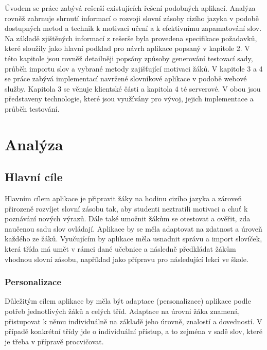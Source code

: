 \documentclass[a4paper,11pt,titlepage,fleqn]{article}
\begin{document}
    Úvodem se práce zabývá rešerší existujících řešení podobných aplikací. Analýza rovněž zahrnuje shrnutí informací o rozvoji slovní zásoby cizího jazyka v podobě dostupných metod a technik k motivaci učení a k efektivnímu zapamatování slov. Na základě zjištěných informací z rešerše byla provedena specifikace požadavků, které sloužily jako hlavní podklad pro návrh aplikace popsaný v kapitole 2. V této kapitole jsou rovněž detailněji popsány způsoby generování testovací sady, průběh importu slov a vybrané metody zajišťující motivaci žáků. V kapitole 3 a 4 se práce zabývá implementací navržené slovníkové aplikace v podobě webové služby. Kapitola 3 se věnuje klientské části a kapitola 4 té serverové. V obou jsou představeny technologie, které jsou využívány pro vývoj, jejich implementace a průběh testování. 



\newpage
\section{Analýza}
    
    \subsection{Hlavní cíle}
        
        Hlavním cílem aplikace je připravit žáky na hodinu cizího jazyka a zároveň přirozeně rozvíjet slovní zásobu tak, aby studenti neztratili motivaci a chuť k poznávání nových výrazů. Dále také umožnit žákům se otestovat a ověřit, zda naučenou sadu slov ovládají. Aplikace by se měla adaptovat na zdatnost a úroveň každého ze žáků. Vyučujícím by aplikace měla usnadnit správu a import slovíček, která třída má umět v rámci dané učebnice a následně předkládat žákům vhodnou slovní zásobu, například jako přípravu pro následující lekci ve škole.

        \subsubsection{Personalizace}
            Důležitým cílem aplikace by měla být adaptace (personalizace) aplikace podle potřeb jednotlivých žáků a celých tříd. Adaptace na úrovni žáka znamená, přistupovat k němu individuálně na základě jeho úrovně, znalostí a dovedností. V případě konkrétní třídy jde o individuální přístup, a to zejména v sadě slov, které je třeba v přípravě procvičovat. 
\end{document}

